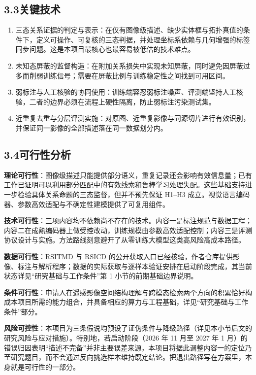 \subsection*{3.3\quad 关键技术}

\begin{enumerate}
    \item 三态关系证据的判定与表示：在仅有图像级描述、缺少实体框与拓扑真值的条件下，定义可操作、可复核的三态判据，并处理坐标系依赖与几何增强的标签同步问题。这是本项目最核心也最容易被低估的技术难点。
    \item 未知态屏蔽的监督构造：在附加关系损失中实现未知屏蔽，同时避免因屏蔽过多而削弱训练信号；需要在屏蔽比例与训练稳定性之间找到可用区间。
    \item 弱标注与人工核验的协同使用：训练端容忍弱标注噪声、评测端坚持人工核验，二者的边界必须在流程上硬性隔离，防止弱标注污染测试集。
    \item 近重复去重与分层评测实施：对原图、近重复影像与同源切片进行有效识别，并保证同一影像的全部描述落在同一数据划分内。
\end{enumerate}

\subsection*{3.4\quad 可行性分析}

\textbf{理论可行性}：图像级描述只能提供部分语义，重复记录还会影响有效信息量\cite{lu2018rsicd,yuan2022amfmn}；已有工作已证明可以利用部分匹配中的有效线索和鲁棒学习处理失配\cite{pmpguard2026,hu2023rcl,han2023msc}。这些基础支持进一步检验具体关系命题的三态监督，但并不预先保证 H1--H3 成立。视觉语言编码器、参数高效适配与不确定性建模提供了可复用组件\cite{radford2021clip,liu2024remoteclip,yuan2023peft,chun2021pcme,li2023pau}。

\textbf{技术可行性}：三项内容均不依赖尚不存在的技术。内容一是标注规范与数据工程；内容二在成熟编码器上做受控改动，训练规模由参数高效适配控制；内容三是评测协议设计与实施。方法路线刻意避开了从零训练大模型这类高风险高成本路径。

\textbf{数据可行性}：RSITMD 与 RSICD 的公开获取入口已经核验，作者仓库提供影像、标注与解析程序；数据的实际获取与逐样本验证安排在启动阶段完成，其当前状态详见“研究基础与工作条件”第 1 小节的前期基础边界说明。

\textbf{条件可行性}：申请人在遥感影像空间结构理解与跨模态检索两个方向的积累恰好构成本项目所需的能力组合，并具备相应的算力与工程基础，详见“研究基础与工作条件”部分。

\textbf{风险可控性}：本项目为三条假说均预设了证伪条件与降级路径（详见本小节后文的研究风险与应对措施）。特别地，若启动阶段（2026 年 11 月至 2027 年 1 月）的错误归因表明“描述不完备”并非主要误差来源，本项目将据此调整内容一的定位乃至研究题目，而不会通过反向挑选样本维持既定结论。把退出路径写在方案里，本身就是可行性的一部分。

